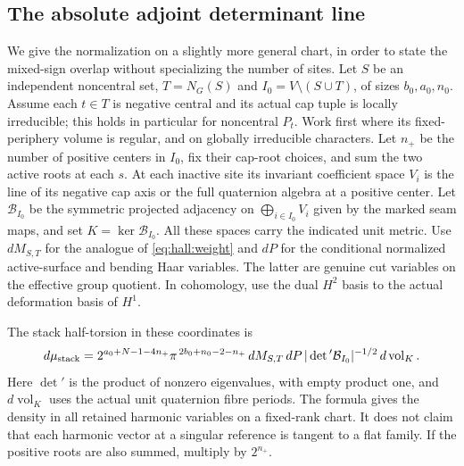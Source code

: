 \subsection{The absolute adjoint determinant line}
\label{sec:hall:torsion}

We give the normalization on a slightly more general chart, in order to
state the mixed-sign overlap without specializing the number of sites.
Let \(S\) be an independent noncentral set, \(T=N_G(S)\) and
\(I_0=V\setminus(S\cup T)\), of sizes \(b_0,a_0,n_0\).
Assume each \(t\in T\) is negative central and its actual cap tuple is
locally irreducible; this holds in particular for noncentral \(P_t\).
Work first where its fixed-periphery volume is regular, and on globally
irreducible characters. Let \(n_+\) be the number of positive centers in
\(I_0\), fix their cap-root choices, and sum the two active roots at
each \(s\). At each inactive site its invariant coefficient space \(V_i\)
is the line of its negative cap axis or the full quaternion algebra at a
positive center. Let \(\mathcal B_{I_0}\) be the symmetric projected
adjacency on \(\bigoplus_{i\in I_0}V_i\) given by the marked seam maps,
and set \(K=\ker\mathcal B_{I_0}\). All these spaces carry the indicated
unit metric. Use \(dM_{S,T}\) for the analogue of \eqref{eq:hall:weight}
and \(dP\) for the conditional normalized active-surface and bending
Haar variables. The latter are genuine cut variables on the effective
group quotient. In cohomology, use the dual \(H^2\) basis to the actual
deformation basis of \(H^1\).

\begin{theorem}
\label{thm:hall:torsion}
The stack half-torsion in these coordinates is
\begin{equation}
 d\mu_{\rm stack}
 =2^{a_0+N-1-4n_+}\pi^{\,2b_0+n_0-2-n_+}\,
    dM_{S,T}\,dP\,
    |\det{}'\mathcal B_{I_0}|^{-1/2}\,d\operatorname{vol}_{K}.
 \label{eq:hall:torsion}
\end{equation}
Here \(\det{}'\) is the product of nonzero eigenvalues, with empty
product one, and \(d\operatorname{vol}_{K}\) uses the actual unit
quaternion fibre periods. The formula gives the density in all retained
harmonic variables on a fixed-rank chart. It does not claim that each
harmonic vector at a singular reference is tangent to a flat family.
If the positive roots are also summed, multiply by \(2^{n_+}\).
\end{theorem}

